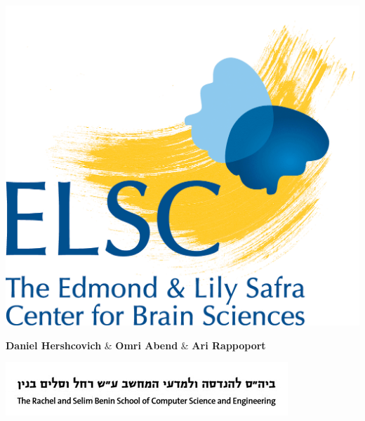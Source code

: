 \documentclass[extrafontsizes,60pt,twocolumn]{memoir}
\begin{document}
\setlength{\columnseprule}{0.4pt}
\setlength{\abovedisplayskip}{3pt}
\setlength{\belowdisplayskip}{3pt}

\begin{strip}
  \begin{center}
  \end{center}
  \vspace{-2.5in}
  \begin{center}
  \begin{minipage}[b]{.1\linewidth}
    \includegraphics[width=\linewidth]{elsc_logo.png}
    \vspace{-2in}
  \end{minipage}
  \hfill
  \begin{minipage}[b]{.75\linewidth}
    \centering
    \begin{minipage}{.7\linewidth}
      \HUGE\textbf{Daniel Hershcovich} \& \textbf{Omri Abend} \& \textbf{Ari Rappoport}
    \end{minipage}
    \begin{minipage}{.25\linewidth}
      \includegraphics[width=\linewidth]{cse_banner.jpg}
    \end{minipage}
    

\end{minipage}
\end{center}
\end{strip}
\end{document}
